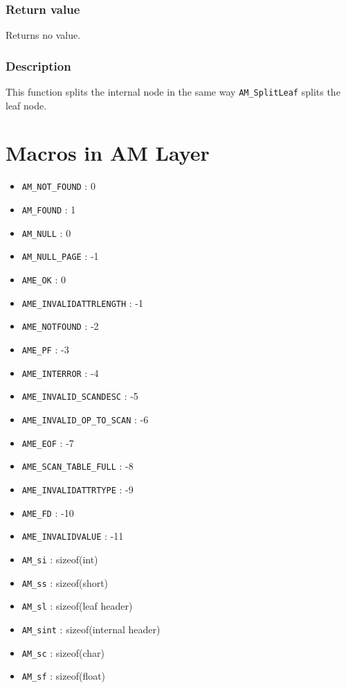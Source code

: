 \documentclass[a4paper, 12pt]{article}
\begin{document}
\subsubsection{Return value}
Returns no value.
\subsubsection{Description}
This function splits the internal node in the same way \texttt{AM\_SplitLeaf} splits the leaf node. 

\section{Macros in AM Layer}
\begin{itemize}
	\item{\texttt{AM\_NOT\_FOUND} : 0}
	\item{\texttt{AM\_FOUND} : 1}
	\item{\texttt{AM\_NULL} : 0}
	\item{\texttt{AM\_NULL\_PAGE} : -1}
	\item{\texttt{AME\_OK} : 0}
	\item{\texttt{AME\_INVALIDATTRLENGTH} : -1}
	\item{\texttt{AME\_NOTFOUND} : -2}
	\item{\texttt{AME\_PF} : -3}
	\item{\texttt{AME\_INTERROR} : -4}
	\item{\texttt{AME\_INVALID\_SCANDESC} : -5}
	\item{\texttt{AME\_INVALID\_OP\_TO\_SCAN} : -6}
	\item{\texttt{AME\_EOF} : -7}
	\item{\texttt{AME\_SCAN\_TABLE\_FULL} : -8}
	\item{\texttt{AME\_INVALIDATTRTYPE} : -9}
	\item{\texttt{AME\_FD} : -10}
	\item{\texttt{AME\_INVALIDVALUE} : -11}
	\item{\texttt{AM\_si} : sizeof(int)}
	\item{\texttt{AM\_ss} : sizeof(short)}
	\item{\texttt{AM\_sl} : sizeof(leaf header)}
	\item{\texttt{AM\_sint} : sizeof(internal header)}
	\item{\texttt{AM\_sc} : sizeof(char)}
	\item{\texttt{AM\_sf} : sizeof(float)}
\end{itemize}
\end{document}
